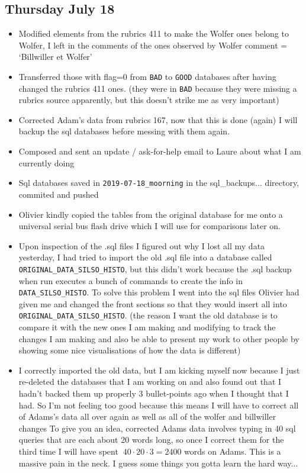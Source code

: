 \documentclass[12pt]{article}
\begin{document}
\subsection{Thursday July 18}
\begin{itemize}
    \item Modified elements from the rubrics 411 to make the Wolfer ones belong to Wolfer, I left in the comments of the ones observed by Wolfer comment = `Billwiller et Wolfer'
    \item Transferred those with flag=0 from \texttt{BAD} to \texttt{GOOD} databases after having changed the rubrics 411 ones. (they were in \texttt{BAD} because they were missing a rubrics source apparently, but this doesn't strike me as very important)
    \item Corrected Adam's data from rubrics 167, now that this is done (again) I will backup the sql databases before messing with them again.
    \item Composed and sent an update / ask-for-help email to Laure about what I am currently doing
    \item Sql databases saved in \texttt{2019-07-18\_moorning} in the sql\_backups... directory, commited and pushed
    \item Olivier kindly copied the tables from the original database for me onto a universal serial bus flash drive which I will use for comparisons later on.
    \item Upon inspection of the .sql files I figured out why I lost all my data yesterday, I had tried to import the old .sql file into a database called \texttt{ORIGINAL\_DATA\_SILSO\_HISTO}, but this didn't work because the .sql backup when run executes a bunch of commands to create the info in \texttt{DATA\_SILSO\_HISTO}. To solve this problem I went into the sql files Olivier had given me and changed the front sections so that they would insert all into \texttt{ORIGINAL\_DATA\_SILSO\_HISTO}. (the reason I want the old database is to compare it with the new ones I am making and modifying to track the changes I am making and also be able to present my work to other people by showing some nice visualisations of how the data is different)
    \item I correctly imported the old data, but I am kicking myself now because I just re-deleted the databases that I am working on and also found out that I hadn't backed them up properly 3 bullet-points ago when I thought that I had. So I'm not feeling too good because this means I will have to correct all of Adams's data all over again as well as all of the wolfer and billwiller changes To give you an idea, corrected Adams data involves typing in 40 sql queries that are each about 20 words long, so once I correct them for the third time I will have spent $~40\cdot20\cdot3=2400$ words on Adams. This is a massive pain in the neck. I guess some things you gotta learn the hard way...

\end{itemize}
\end{document}
